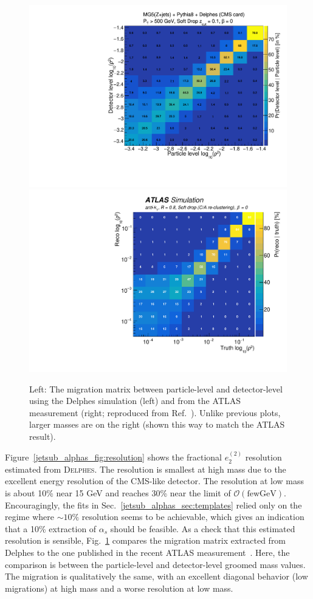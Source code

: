 \documentclass[11pt]{cernrep}
\begin{document}
\begin{figure}[t]
\begin{center}
\includegraphics[width = 0.49\columnwidth]{jetsub_alphas_Rho_2D.pdf}\includegraphics[width = 0.49\columnwidth]{jetsub_alphas_figaux_03a.pdf}
\end{center}
\caption{Left: The migration matrix between particle-level and detector-level using the Delphes simulation (left) and from the ATLAS measurement (right; reproduced from Ref.~\cite{Aaboud:2017qwh}).  Unlike previous plots, larger masses are on the right (shown this way to match the ATLAS result). }
\label{jetsub_alphas_fig:expres}
\end{figure}

Figure~\ref{jetsub_alphas_fig:resolution} shows the fractional $e_2^{(2)}$ resolution estimated from \textsc{Delphes}.
%
The resolution is smallest at high mass due to the excellent energy resolution of the CMS-like detector.
%
The resolution at low mass is about 10\% near 15 GeV and reaches 30\% near the limit of $\mathcal{O}(\mathrm{few GeV})$.
%
Encouragingly, the fits in Sec.~\ref{jetsub_alphas_sec:templates} relied only on the regime where $\sim 10\%$ resolution seems to be achievable, which gives an indication that a 10\% extraction of $\alpha_s$ should be feasible.
%
As a check that this estimated resolution is sensible, Fig.~\ref{jetsub_alphas_fig:expres} compares the migration matrix extracted from Delphes to the one published in the recent ATLAS measurement~\cite{Aaboud:2017qwh}.
%
Here, the comparison is between the particle-level and detector-level groomed mass values. 
%
The migration is qualitatively the same, with an excellent diagonal behavior (low migrations) at high mass and a worse resolution at low mass.
\end{document}
